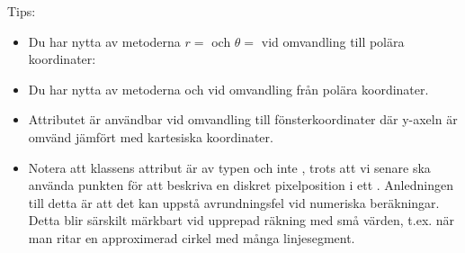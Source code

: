 \noindent Tips:
\begin{itemize}
\item Du har nytta av metoderna $r = $  och $\theta = $  vid omvandling till polära koordinater:


\item Du har nytta av metoderna  och  vid omvandling från polära koordinater.

\item Attributet  är användbar vid omvandling till fönsterkoordinater där y-axeln är omvänd jämfört med kartesiska koordinater.

\item Notera att klassens attribut är av typen  och inte , trots att vi senare ska använda punkten för att beskriva en diskret pixelposition i ett . Anledningen till detta är att det kan uppstå avrundningsfel vid numeriska beräkningar. Detta blir särskilt märkbart vid upprepad räkning med små värden, t.ex. när man ritar en approximerad cirkel med många linjesegment.
\end{itemize}

